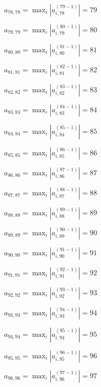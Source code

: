 \documentclass[a4paper,12pt]{article}
\begin{document}
$a _{ 78, 78 } =  \max _i |a _{ i, 78 } ^{ (79 - 1) } | = 79$

$a _{ 79, 79 } =  \max _i |a _{ i, 79 } ^{ (80 - 1) } | = 80$

$a _{ 80, 80 } =  \max _i |a _{ i, 80 } ^{ (81 - 1) } | = 81$

$a _{ 81, 81 } =  \max _i |a _{ i, 81 } ^{ (82 - 1) } | = 82$

$a _{ 82, 82 } =  \max _i |a _{ i, 82 } ^{ (83 - 1) } | = 83$

$a _{ 83, 83 } =  \max _i |a _{ i, 83 } ^{ (84 - 1) } | = 84$

$a _{ 84, 84 } =  \max _i |a _{ i, 84 } ^{ (85 - 1) } | = 85$

$a _{ 85, 85 } =  \max _i |a _{ i, 85 } ^{ (86 - 1) } | = 86$

$a _{ 86, 86 } =  \max _i |a _{ i, 86 } ^{ (87 - 1) } | = 87$

$a _{ 87, 87 } =  \max _i |a _{ i, 87 } ^{ (88 - 1) } | = 88$

$a _{ 88, 88 } =  \max _i |a _{ i, 88 } ^{ (89 - 1) } | = 89$

$a _{ 89, 89 } =  \max _i |a _{ i, 89 } ^{ (90 - 1) } | = 90$

$a _{ 90, 90 } =  \max _i |a _{ i, 90 } ^{ (91 - 1) } | = 91$

$a _{ 91, 91 } =  \max _i |a _{ i, 91 } ^{ (92 - 1) } | = 92$

$a _{ 92, 92 } =  \max _i |a _{ i, 92 } ^{ (93 - 1) } | = 93$

$a _{ 93, 93 } =  \max _i |a _{ i, 93 } ^{ (94 - 1) } | = 94$

$a _{ 94, 94 } =  \max _i |a _{ i, 94 } ^{ (95 - 1) } | = 95$

$a _{ 95, 95 } =  \max _i |a _{ i, 95 } ^{ (96 - 1) } | = 96$

$a _{ 96, 96 } =  \max _i |a _{ i, 96 } ^{ (97 - 1) } | = 97$
\end{document}
